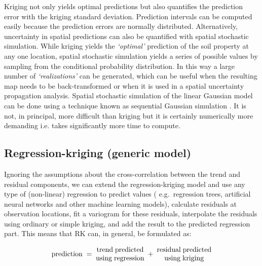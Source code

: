 \documentclass[graybox,natbib,nospthms,UStrade]{svmono}
\begin{document}
Kriging not only yields optimal predictions but also quantifies the
prediction error with the kriging standard deviation. Prediction
intervals can be computed easily because the prediction errors are
normally distributed. Alternatively, uncertainty in spatial predictions
can also be quantified with spatial stochastic simulation. While kriging
yields the \emph{`optimal'} prediction of the soil property at any one
location, spatial stochastic simulation yields a series of possible
values by sampling from the conditional probability distribution. In
this way a large number of \emph{`realizations'} can be generated, which can
be useful when the resulting map needs to be back-transformed or when it
is used in a spatial uncertainty propagation analysis. Spatial
stochastic simulation of the linear Gaussian model can be done using a
technique known as sequential Gaussian simulation
\citep{Goovaerts1997Oxford, Yamamoto2008}. It is not, in principal, more
difficult than kriging but it is certainly numerically more demanding i.e.
takes significantly more time to compute.

\hypertarget{RK-generic}{%
\subsection{Regression-kriging (generic model)}\label{RK-generic}}

Ignoring the assumptions about the cross-correlation between the trend
and residual components, we can extend the regression-kriging model and
use any type of (non-linear) regression to predict values (
e.g.~regression trees, artificial neural networks and other machine learning
models), calculate residuals at observation locations, fit a variogram
for these residuals, interpolate the residuals using ordinary or simple
kriging, and add the result to the predicted regression part. This means
that RK can, in general, be formulated as:

\begin{equation}
{\rm prediction} \; = \;
\begin{matrix}
{\rm trend} \; {\rm predicted} \\
{\rm using} \; {\rm regression} \end{matrix} \; + \;
\begin{matrix}
{\rm residual} \; {\rm predicted} \\
{\rm using} \; {\rm kriging} \end{matrix}
\label{eq:RKgeneral}
\end{equation}
\end{document}
